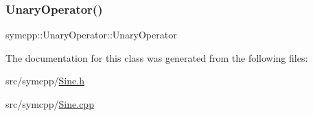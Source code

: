 \mbox{\label{classsymcpp_1_1Sine_a23a8172db96675ebf1114f4f3f41b6f1}} 
\subsubsection{\texorpdfstring{UnaryOperator()}{UnaryOperator()}\hspace{0.1cm}{\footnotesize\ttfamily [2/2]}}
{\footnotesize\ttfamily symcpp\+::\+Unary\+Operator\+::\+Unary\+Operator\hspace{0.3cm}{\ttfamily [inline]}}



The documentation for this class was generated from the following files\+:\begin{DoxyCompactItemize}
\item 
src/symcpp/\mbox{\hyperlink{Sine_8h}{Sine.\+h}}\item 
src/symcpp/\mbox{\hyperlink{Sine_8cpp}{Sine.\+cpp}}\end{DoxyCompactItemize}
